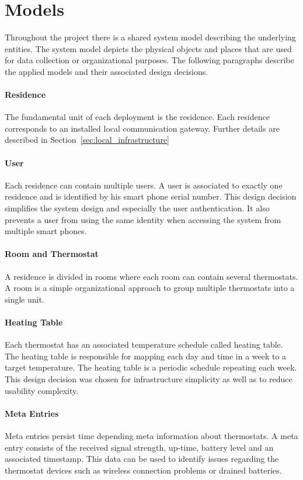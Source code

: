 \section{Models}
\label{sec:system_overview_models}

Throughout the project there is a shared system model describing the underlying entities. The system model depicts the physical objects and places that are used for data collection or organizational purposes. The following paragraphs describe the applied models and their associated design decisions.

\paragraph{Residence}

The fundamental unit of each deployment is the residence. Each residence corresponds to an installed local communication gateway. Further details are described in Section~\ref{sec:local_infrastructure}

\paragraph{User}

Each residence can contain multiple users. A user is associated to exactly one residence and is identified by his smart phone serial number. This design decision simplifies the system design and especially the user authentication. It also prevents a user from using the same identity when accessing the system from multiple smart phones.

\paragraph{Room and Thermostat}
A residence is divided in rooms where each room can contain several thermostats. A room is a simple organizational approach to group multiple thermostats into a single unit.

\paragraph{Heating Table}

Each thermostat has an associated temperature schedule called heating table.
The heating table is responsible for mapping each day and time in a week to a target temperature. The heating table is a periodic schedule repeating each week.
This design decision was chosen for infrastructure simplicity as well as to reduce usability complexity.

\paragraph{Meta Entries}

Meta entries persist time depending meta information about thermostats. A meta entry consists of the received signal strength, up-time, battery level and an associated timestamp. This data can be used to identify issues regarding the thermostat devices such as wireless connection problems or drained batteries.